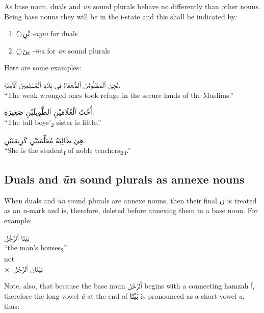 \documentclass[
  10pt,
]{book}
\providecommand{\tightlist}{%
  \setlength{\itemsep}{0pt}\setlength{\parskip}{0pt}}
\begin{document}
As base noun, duals and \emph{ūn} sound plurals behave no differently than other nouns. Being base nouns they will be in the i-state and this shall be indicated by:

\begin{enumerate}
\def\labelenumi{\roman{enumi}.}
\tightlist
\item
  \foreignlanguage{arabic}{◌َيْنِ} \emph{-ayni} for duals
\item
  \foreignlanguage{arabic}{◌ِينَ} \emph{-īna} for \emph{ūn} sound plurals
\end{enumerate}

Here are some examples:

\foreignlanguage{arabic}{لَجِئَ ٱلْمَظْلُومُنَ ٱلضُّعَفَاءُ فِي بِلَادِ ٱلْمُسْلِمِينَ ٱلْآمِنَةِ.}\\
\enquote{The weak wronged ones took refuge in the secure lands of the Muslims.}

\foreignlanguage{arabic}{أُخُتُ ٱلْغُلَامَيْنِ ٱلطَّوِيلَيْنِ صَغِيرَةِ.}\\
\enquote{The tall boys'\textsubscript{2} sister is little.}

\foreignlanguage{arabic}{هِيَ طَالِبَةُ مُعَلِّمَتَيْنِ کَرِيمَتَيْنِ.}\\
\enquote{She is the student\textsubscript{f} of noble teachers\textsubscript{2,f}.}

\subsection{\texorpdfstring{Duals and \emph{ūn} sound plurals as annexe nouns}{Duals and ūn sound plurals as annexe nouns}}\label{duals-and-un-sound-plurals-as-annexe-nouns}

When duals and \emph{ūn} sound plurals are annexe nouns, then their final \foreignlanguage{arabic}{ن} is treated as an \emph{n}-mark and is, therefore, deleted before annexing them to a base noun. For example:

\foreignlanguage{arabic}{بَيْتَا ٱلرَّجُلِ}\\
\enquote{the man's houses\textsubscript{2}}\\
not\\
\(\times\)~\foreignlanguage{arabic}{بَيْتَانِ ٱلرَّجُلِ}

Note, also, that because the base noun \foreignlanguage{arabic}{ٱَلرَّجُلِ} begins with a connecting hamzah \foreignlanguage{arabic}{ٱ}, therefore the long vowel \emph{ā} at the end of \foreignlanguage{arabic}{بَيْتَا} is pronounced as a short vowel \emph{a}, thus:
\end{document}
